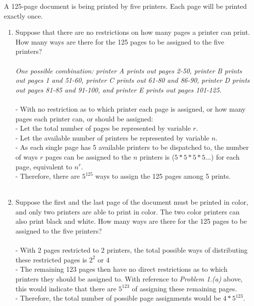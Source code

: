 \documentclass{amsart}
\theoremstyle{definition}
\theoremstyle{Exercise}
\theoremstyle{remark}
\theoremstyle{rule}
\numberwithin{equation}{section}
\begin{document}
A 125-page document is being printed by five printers. Each page will be printed exactly once.
 \begin{enumerate}[label=(\alph*)]
 \item  Suppose that there are no restrictions on how many pages a printer can print. How many ways are there for the 125 pages to be assigned to the five printers?\\\\
{\it One possible combination: printer A prints out pages 2-50, printer B prints out pages 1 and 51-60, printer C prints out 61-80 and 86-90, printer D prints 
out pages 81-85 and 91-100, and printer E prints out pages 101-125.}\\\\
  - With no restriction as to which printer each page is assigned, or how many pages each printer can, or should be assigned:\\
  - Let the total number of pages be represented by variable $r$.\\
  - Let the available number of printers be represented by variable $n$.\\
  - As each single page has 5 available printers to be dispatched to, the number of ways $r$ pages can be assigned to the $n$ printers is 
  ($5*5*5*5\dots$) for each page, equivalent to $n^r$.\\
  - Therefore, there are $5^{125}$ ways to assign the 125 pages among 5 prints.
        \\\\
 \item Suppose the first and the last page of the document must be printed in color, and only two printers are able to print in color. The two color printers 
 can also print black and white. How many ways are there for the 125 pages to be assigned to the five printers?\\\\
  - With 2 pages restricted to 2 printers, the total possible ways of distributing these restricted pages is $2^2$ or $4$\\
  - The remaining 123 pages then have no direct restrictions as to which printers they should be assigned to. With reference to \textit{Problem 1.(a)} above,
  this would indicate that there are $5^{123}$ of assigning these remaining pages.\\
  - Therefore, the total number of possible page assignments would be $4*5^{123}$.\\

\end{enumerate}
\end{document}
